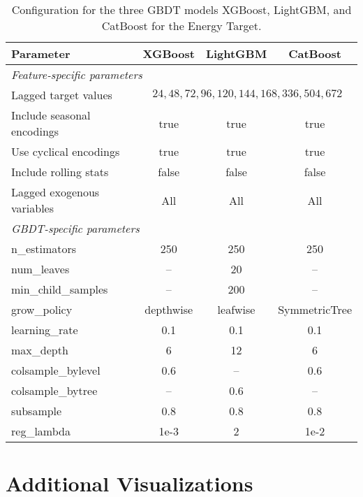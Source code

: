 \begin{table}[htbp]
  \centering
  \begin{tabular}{@{} lccc @{}}
    \toprule
    \textbf{Parameter} & \textbf{XGBoost} & \textbf{LightGBM} & \textbf{CatBoost} \\ 
    \midrule
    \multicolumn{4}{l}{\textit{Feature-specific parameters}} \\
    Lagged target values & \multicolumn{3}{c}{ $24,48,72,96,120,144,168,336,504,672$} \\
    Include seasonal encodings & true & true & true \\
    Use cyclical encodings & true & true & true \\
    Include rolling stats & false & false & false \\
    Lagged exogenous variables & All & All & All \\
    \midrule
    \multicolumn{4}{l}{\textit{GBDT-specific parameters}} \\
    n\_estimators & 250 & 250 & 250 \\
    num\_leaves & -- & 20 & -- \\
    min\_child\_samples & -- & 200 & -- \\
    grow\_policy & depthwise & leafwise & SymmetricTree \\
    learning\_rate & 0.1 & 0.1 & 0.1 \\
    max\_depth & 6 & 12 & 6 \\
    colsample\_bylevel & 0.6 & -- & 0.6 \\
    colsample\_bytree & -- & 0.6 & -- \\
    subsample & 0.8 & 0.8 & 0.8 \\
    reg\_lambda & 1e-3 & 2 & 1e-2 \\
    \bottomrule
  \end{tabular}
  \caption{Configuration for the three GBDT models XGBoost, LightGBM, and CatBoost for the Energy Target.}
  \label{tab:model-config-energy}
\end{table}


\newpage
\section{Additional Visualizations}
\label{appendix:additional-visualizations}

